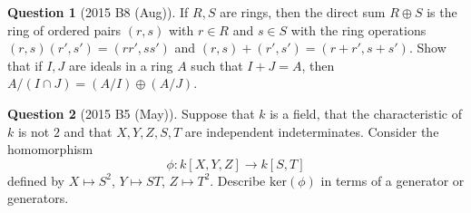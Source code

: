 \documentclass{article}
\numberwithin{equation}{section}
\theoremstyle{definition}
\newtheorem{quest}{Question}
\renewcommand{\.}{\,.}
\begin{document}
\begin{quest}[2015 B8 (Aug)]
If $R,S$ are rings, then the direct sum $R\oplus S$ is the ring of ordered pairs $(r,s)$ with $r\in R$ and $s\in S$ with the ring operations $(r,s)(r',s')=(rr',ss')$ and $(r,s)+(r',s')=(r+r', s+s')$. Show that if $I,J$ are ideals in a ring $A$ such that $I+J=A$, then $A/(I\cap J)=(A/I)\oplus (A/J)$.
\end{quest}

\begin{quest}[2015 B5 (May)]
Suppose that $k$ is a field, that the characteristic of $k$ is not $2$ and that $X,Y,Z,S,T$ are independent indeterminates. Consider the homomorphism
\begin{equation*}
\phi: k[X,Y,Z] \to k[S,T]
\end{equation*}
defined by $X\mapsto S^2$, $Y\mapsto ST$, $Z\mapsto T^2$. Describe $\text{ker}(\phi)$ in terms of a generator or generators.
\end{quest}
\end{document}
